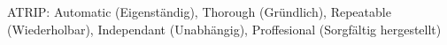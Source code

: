 ATRIP: Automatic (Eigenständig), Thorough (Gründlich), Repeatable (Wiederholbar), Independant (Unabhängig), Proffesional (Sorgfältig hergestellt)